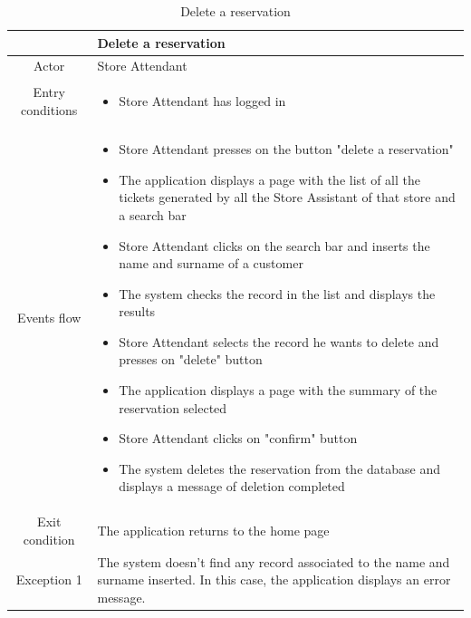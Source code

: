 \documentclass[table, 12pt]{article}
\begin{document}
\begin{minipage}{\textwidth}
    \begin{longtable}{|c| p{10cm}|}
        \caption{Delete a reservation}                                                                                                                              \\
        \hline
                         & Delete a reservation                                                                                                                     \\
        \hline
        Actor            & Store Attendant                                                                                                                          \\
        \hline
        Entry conditions & \begin{itemize}
            \item Store Attendant has logged in
        \end{itemize}                                                                                                               \\
        \hline
        Events flow      & \begin{itemize}[nosep,after=\strut]
            \item Store Attendant presses on the button "delete a reservation"
            \item The application displays a page with the list of all the tickets generated by all the Store Assistant of that store and a search bar
            \item Store Attendant clicks on the search bar and inserts the name and surname of a customer
            \item The system checks the record in the list and displays the results
            \item Store Attendant selects the record he wants to delete and presses on "delete" button
            \item The application displays a page with the summary of the reservation selected
            \item Store Attendant clicks on "confirm" button
            \item The system deletes the reservation from the database and displays a message of deletion completed
        \end{itemize}                                                                                                               \\
        \hline
        Exit condition   & The application returns to the home page
        \\
        \hline
        \hline
        Exception 1      & The system doesn't find any record associated to the name and surname inserted. In this case, the application displays an error message. \\
        \hline
    \end{longtable}
\end{minipage}
\end{document}
